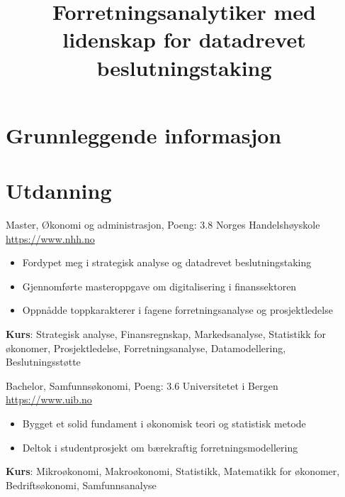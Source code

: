 \documentclass[a4paper, serif, 10pt]{moderncv}
\title{Forretningsanalytiker med lidenskap for datadrevet beslutningstaking}
\begin{document}
\maketitle

\section{Grunnleggende informasjon}

\section{Utdanning}

        {Master, Økonomi og administrasjon, Poeng: 3.8}
        {Norges Handelshøyskole}
        {\url{https://www.nhh.no}}
        {}
        {\begin{itemize}
\item Fordypet meg i strategisk analyse og datadrevet beslutningstaking
\item Gjennomførte masteroppgave om digitalisering i finanssektoren
\item Oppnådde toppkarakterer i fagene forretningsanalyse og prosjektledelse
\end{itemize}
\textbf{Kurs}: Strategisk analyse, Finansregnskap, Markedsanalyse, Statistikk for økonomer, Prosjektledelse, Forretningsanalyse, Datamodellering, Beslutningsstøtte}

        {Bachelor, Samfunnsøkonomi, Poeng: 3.6}
        {Universitetet i Bergen}
        {\url{https://www.uib.no}}
        {}
        {\begin{itemize}
\item Bygget et solid fundament i økonomisk teori og statistisk metode
\item Deltok i studentprosjekt om bærekraftig forretningsmodellering
\end{itemize}
\textbf{Kurs}: Mikroøkonomi, Makroøkonomi, Statistikk, Matematikk for økonomer, Bedriftsøkonomi, Samfunnsanalyse}
\end{document}
